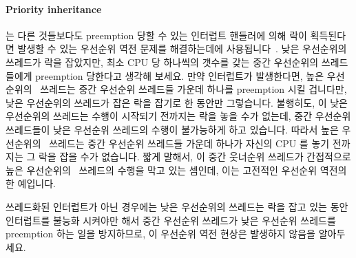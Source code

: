 \paragraph{Priority inheritance} 는 다른 것들보다도 preemption 당할 수 있는
인터럽트 핸들러에 의해 락이 획득된다면 발생할 수 있는 우선순위 역전 문제를
해결하는데에 사용됩니다~\cite{LuiSha1990PriorityInheritance}.
낮은 우선순위의 쓰레드가 락을 잡았지만, 최소 CPU 당 하나씩의 갯수를 갖는 중간
우선순위의 쓰레드들에게 preemption 당한다고 생각해 보세요.
만약 인터럽트가 발생한다면, 높은 우선순위의 \IRQ\ 쓰레드는 중간 우선순위
쓰레드들 가운데 하나를 preemption 시킬 겁니다만, 낮은 우선순위의 쓰레드가 잡은
락을 잡기로 한 동안만 그렇습니다.
불행히도, 이 낮은 우선순위의 쓰레드는 수행이 시작되기 전까지는 락을 놓을 수가
없는데, 중간 우선순위 쓰레드들이 낮은 우선순위 쓰레드의 수행이 불가능하게 하고
있습니다.
따라서 높은 우선순위의 \IRQ\ 쓰레드는 중간 우선순위 쓰레드들 가운데 하나가
자신의 CPU 를 놓기 전까지는 그 락을 잡을 수가 없습니다.
짧게 말해서, 이 중간 웃너순위 쓰레드가 간접적으로 높은 우선순위의 \IRQ\
쓰레드의 수행을 막고 있는 셈인데, 이는 고전적인 우선순위 역전의 한 예입니다.

쓰레드화된 인터럽트가 아닌 경우에는 낮은 우선순위의 쓰레드는 락을 잡고 있는
동안 인터럽트를 불능화 시켜야만 해서 중간 우선순위 쓰레드가 낮은 우선순위
쓰레드를 preemption 하는 일을 방지하므로, 이 우선순위 역전 현상은 발생하지
않음을 알아두세요.

